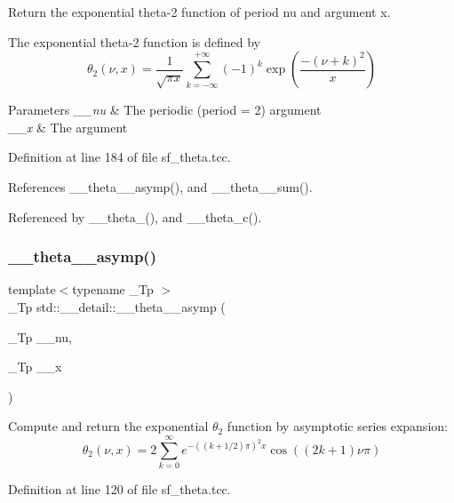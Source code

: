 Return the exponential theta-\/2 function of period {\ttfamily nu} and argument {\ttfamily x}.

The exponential theta-\/2 function is defined by \[ \theta_2(\nu,x) = \frac{1}{\sqrt{\pi x}} \sum_{k=-\infty}^{+\infty} (-1)^k \exp\left( \frac{-(\nu + k)^2}{x} \right) \]


\begin{DoxyParams}{Parameters}
{\em \+\_\+\+\_\+nu} & The periodic (period = 2) argument \\
\hline
{\em \+\_\+\+\_\+x} & The argument \\
\hline
\end{DoxyParams}


Definition at line 184 of file sf\+\_\+theta.\+tcc.



References \+\_\+\+\_\+theta\+\_\+\_\+asymp(), and \+\_\+\+\_\+theta\+\_\+\_\+sum().



Referenced by \+\_\+\+\_\+theta\+\_(), and \+\_\+\+\_\+theta\+\_\+c().

\mbox{\label{namespacestd_1_1____detail_ac7207ce23916e29df96b3b2159b55150}} 
\subsubsection{\texorpdfstring{\+\_\+\+\_\+theta\+\_\+\_\+asymp()}{\_\_theta\_2\_asymp()}}
{\footnotesize\ttfamily template$<$typename \+\_\+\+Tp $>$ \\
\+\_\+\+Tp std\+::\+\_\+\+\_\+detail\+::\+\_\+\+\_\+theta\+\_\+\_\+asymp (\begin{DoxyParamCaption}\item[{\+\_\+\+Tp}]{\+\_\+\+\_\+nu,  }\item[{\+\_\+\+Tp}]{\+\_\+\+\_\+x }\end{DoxyParamCaption})}

Compute and return the exponential $ \theta_2 $ function by asymptotic series expansion\+: \[ \theta_2(\nu, x) = 2\sum_{k=0}^{\infty} e^{-((k+1/2)\pi)^2 x} \cos((2k+1)\nu\pi) \] 

Definition at line 120 of file sf\+\_\+theta.\+tcc.




